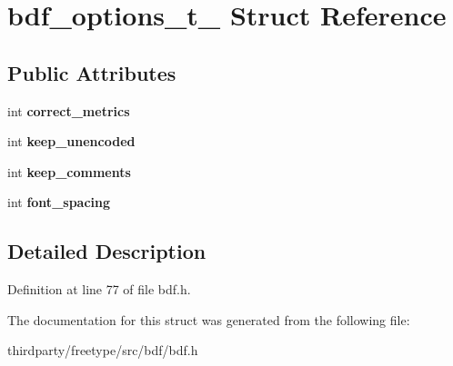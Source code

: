 \hypertarget{structbdf__options__t__}{}\section{bdf\+\_\+options\+\_\+t\+\_\+ Struct Reference}
\label{structbdf__options__t__}
\subsection*{Public Attributes}
\begin{DoxyCompactItemize}
\item 
\mbox{\label{structbdf__options__t___a7760d998775a313d0de1f82e05f29413}} 
int {\bfseries correct\+\_\+metrics}
\item 
\mbox{\label{structbdf__options__t___abc0d310fd4c255ea2e123c0f740f9343}} 
int {\bfseries keep\+\_\+unencoded}
\item 
\mbox{\label{structbdf__options__t___a3342dbb177bc6fd3d9c886001016af61}} 
int {\bfseries keep\+\_\+comments}
\item 
\mbox{\label{structbdf__options__t___a61ff6d601365441d5d878b0be67d044f}} 
int {\bfseries font\+\_\+spacing}
\end{DoxyCompactItemize}


\subsection{Detailed Description}


Definition at line 77 of file bdf.\+h.



The documentation for this struct was generated from the following file\+:\begin{DoxyCompactItemize}
\item 
thirdparty/freetype/src/bdf/bdf.\+h\end{DoxyCompactItemize}
